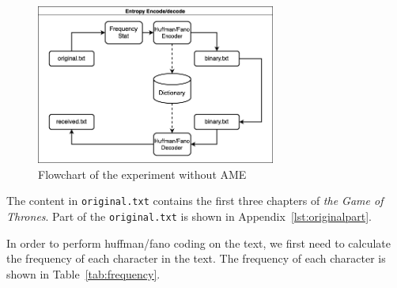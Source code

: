 \documentclass[12pt,twoside]{article}
\begin{document}
\begin{figure}[h!]
    \centering
    \includegraphics[width=0.7\textwidth]{without-ame.png}
    \caption{Flowchart of the experiment without AME}
    \label{fig:without-ame}
\end{figure}

The content in \texttt{original.txt} contains the first three chapters of \textit{the Game of Thrones}. Part of the \texttt{original.txt} is shown in Appendix~\ref{lst:originalpart}.

In order to perform huffman/fano coding on the text, we first need to calculate the frequency of each character in the text. The frequency of each character is shown in Table~\ref{tab:frequency}.
\end{document}
